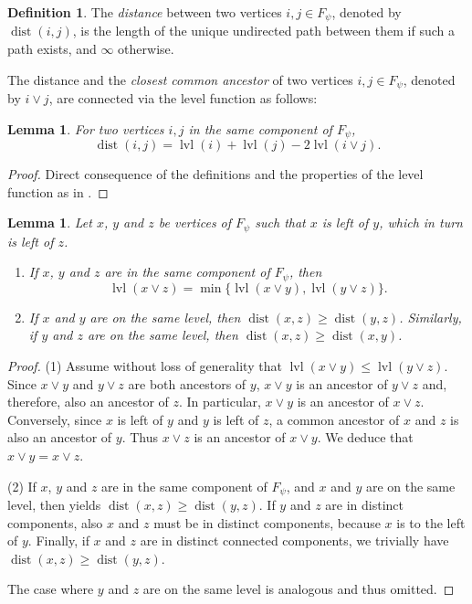 \documentclass[a4paper]{amsart}
\newtheorem{lemma}[theorem]{Lemma}
\theoremstyle{definition}
\newtheorem{definition}[theorem]{Definition}
\theoremstyle{remark}
\numberwithin{equation}{theorem}
\newcommand{\Dfn}[1]{\emph{\color{blue}#1}} %
\newcommand{\dist}{\operatorname{dist}}
\newcommand{\level}{\operatorname{lvl}}
\newcommand{\psiforest}{F_\psi}
\begin{document}
\begin{definition}
    The \Dfn{distance} between two vertices $i , j \in \psiforest$, denoted by $\dist(i,j)$, is the length of the unique undirected path between them if such a path exists, and $\infty$ otherwise.
\end{definition}

The distance and the \Dfn{closest common ancestor} of two vertices $ i , j \in \psiforest $, denoted by $ i \vee j $,  are connected via the level function as follows:

\begin{lemma}\label{prop:distance}
    For two vertices $ i , j $ in the same component of $ \psiforest $,
    \[
        \dist(i, j) = \level(i) + \level(j) - 2 \level(i\vee j).
    \]
\end{lemma}

\begin{proof}
    Direct consequence of the definitions and the properties of the level function as in .
\end{proof}

\begin{lemma}\label{lemma:common-ancestor}
  Let $x$, $y$ and $z$ be vertices of $\psiforest$ such that $x$ is
  left of $y$, which in turn is left of $z$.
    \begin{enumerate}
        \item If $x$, $y$ and $z$ are in the same component of
  $\psiforest$, then
  \[
    \level(x\vee z) = \min\{\level(x\vee y), \level(y\vee z)\}.
  \]
       \item If $x$ and $y$ are on the same level, then
  $\dist(x, z)\geq\dist(y, z)$.
  Similarly, if $y$
  and $z$ are on the same level, then $\dist(x, z)\geq\dist(x, y)$.
    \end{enumerate}
\end{lemma}
\begin{proof}
  (1) Assume without loss of
  generality that $\level(x\vee y)\leq\level(y\vee z)$.  Since
  $x\vee y$ and $y\vee z$ are both ancestors of $y$, $x\vee y$ is an
  ancestor of $y\vee z$ and, therefore, also an ancestor of $z$.  In
  particular, $x\vee y$ is an ancestor of $x\vee z$.  Conversely,
  since $x$ is left of $y$ and $y$ is left of $z$, a common ancestor
  of $x$ and $z$ is also an ancestor of $y$.  Thus $x\vee z$ is an
  ancestor of $x\vee y$.  We deduce that $x\vee y = x\vee z$.

  (2) If $x$, $y$ and $z$ are in the same component of $\psiforest$, and $x$ and $y$ are on the same level, then
   yields $\dist(x, z)\geq\dist(y, z)$.
  If $y$ and $z$ are in distinct components, also $x$ and
  $z$ must be in distinct components, because $x$ is to the
  left of $y$.  Finally, if $x$ and $z$ are in distinct connected
  components, we trivially have $\dist(x, z)\geq\dist(y, z)$.

  The case where $y$
  and $z$ are on the same level is analogous and thus omitted.
\end{proof}
\end{document}
